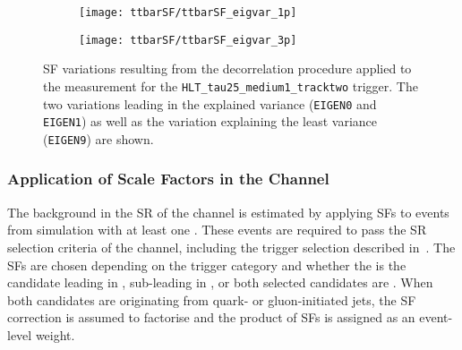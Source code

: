 \begin{figure}[htbp]
  \centering

  \begin{subfigure}[t]{.495\textwidth}
    \texttt{[image: ttbarSF/ttbarSF\_eigvar\_1p]}
    \label{fig:ttbarSF_eigenvariations_1p}
  \end{subfigure}\hfill%
  \begin{subfigure}[t]{.495\textwidth}
    \texttt{[image: ttbarSF/ttbarSF\_eigvar\_3p]}
    \label{fig:ttbarSF_eigenvariations_3p}
  \end{subfigure}


  \caption[Systematic variations of the \faketauhadvis SFs for the
  \texttt{HLT\_tau25\_medium1\_tracktwo} trigger.]{\Faketauhadvis SF variations
    resulting from the decorrelation procedure applied to the measurement for
    the \texttt{HLT\_tau25\_medium1\_tracktwo} trigger. The two variations
    leading in the explained variance (\texttt{EIGEN0} and \texttt{EIGEN1}) as
    well as the variation explaining the least variance (\texttt{EIGEN9}) are
    shown.}%
  \label{fig:ttbarSF_eigenvariations}
\end{figure}


\subsubsection{Application of \Faketauhadvis Scale Factors in the \hadhad
  Channel}

The \ttbarFakes background in the SR of the \hadhad channel is estimated by
applying \faketauhadvis SFs to \ttbar events from simulation with at least one
\faketauhadvis. These events are required to pass the SR selection criteria of
the \hadhad channel, including the trigger selection described
in~. The SFs are chosen depending on the trigger category and
whether the \faketauhadvis is the \tauhadvis candidate leading in \pT,
sub-leading in \pT, or both selected candidates are \faketauhadvis. When both
\tauhadvis candidates are originating from quark- or gluon-initiated jets, the
SF correction is assumed to factorise and the product of SFs is assigned as an
event-level weight.

